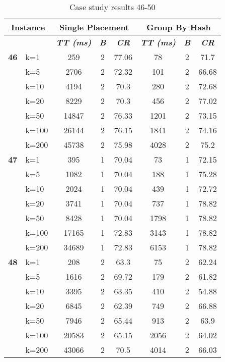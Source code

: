     \begin{table}[htbp]
    \caption{Case study results 46-50}
    \centering
    \begin{tabular}{|l|l|c|c|c|c|c|c|}
    \hline
    \multicolumn{ 2}{|c|}{\textbf{Instance}} & \multicolumn{ 3}{c|}{\textbf{Single Placement}} & \multicolumn{ 3}{c|}{\textbf{Group By Hash}} \\ \hline
    \multicolumn{ 2}{|l|}{} & \textbf{\textit{TT (ms)}} & \textbf{\textit{B}} & \textbf{\textit{CR}} & \textbf{\textit{TT (ms)}} & \textbf{\textit{B}} & \textbf{\textit{CR}} \\ \hline
    \multicolumn{1}{|r|}{\textbf{46}} & k=1 & 259 & 2 & 77.06 & 78 & 2 & 71.7 \\ 
     & k=5 & 2706 & 2 & 72.32 & 101 & 2 & 66.68 \\ 
     & k=10 & 4194 & 2 & 70.3 & 280 & 2 & 72.68 \\ 
     & k=20 & 8229 & 2 & 70.3 & 456 & 2 & 77.02 \\ 
     & k=50 & 14847 & 2 & 76.33 & 1201 & 2 & 73.15 \\ 
     & k=100 & 26144 & 2 & 76.15 & 1841 & 2 & 74.16 \\ 
     & k=200 & 45738 & 2 & 75.98 & 4028 & 2 & 75.2 \\ \hline
    \multicolumn{1}{|r|}{\textbf{47}} & k=1 & 395 & 1 & 70.04 & 73 & 1 & 72.15 \\ 
     & k=5 & 1082 & 1 & 70.04 & 188 & 1 & 75.28 \\ 
     & k=10 & 2024 & 1 & 70.04 & 439 & 1 & 72.72 \\ 
     & k=20 & 3741 & 1 & 70.04 & 737 & 1 & 78.82 \\ 
     & k=50 & 8428 & 1 & 70.04 & 1798 & 1 & 78.82 \\ 
     & k=100 & 17165 & 1 & 72.83 & 3143 & 1 & 78.82 \\ 
     & k=200 & 34689 & 1 & 72.83 & 6153 & 1 & 78.82 \\ \hline
    \multicolumn{1}{|r|}{\textbf{48}} & k=1 & 208 & 2 & 63.3 & 75 & 2 & 62.24 \\ 
     & k=5 & 1616 & 2 & 69.72 & 179 & 2 & 61.82 \\ 
     & k=10 & 3395 & 2 & 63.35 & 410 & 2 & 54.88 \\ 
     & k=20 & 6845 & 2 & 62.39 & 749 & 2 & 66.88 \\ 
     & k=50 & 7946 & 2 & 65.44 & 913 & 2 & 63.9 \\ 
     & k=100 & 20583 & 2 & 65.15 & 2056 & 2 & 64.02 \\ 
     & k=200 & 43066 & 2 & 70.5 & 4014 & 2 & 66.03 \\ \hline

\end{tabular}
\end{table}

